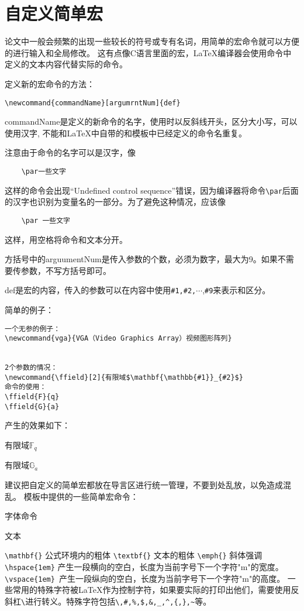 \documentclass[supercite,fontset=windows]{../../upcthesis}
\begin{document}
\section{自定义简单宏}
论文中一般会频繁的出现一些较长的符号或专有名词，用简单的宏命令就可以方便的进行输入和全局修改。
这有点像C语言里面的宏，LaTeX编译器会使用命令中定义的文本内容代替实际的命令。

定义新的宏命令的方法：

\begin{verbatim}
\newcommand{commandName}[argumrntNum]{def}
\end{verbatim}

commandName是定义的新命令的名字，使用时以反斜线开头，区分大小写，可以使用汉字,
不能和LaTeX中自带的和模板中已经定义的命令名重复。

注意由于命令的名字可以是汉字，像
\begin{verbatim}
	\par一些文字
\end{verbatim}
这样的命令会出现“Undefined control sequence”错误，因为编译器将命令\verb|\par|后面的汉字也识别为变量名的一部分。为了避免这种情况，应该像
\begin{verbatim}
	\par 一些文字
\end{verbatim}
这样，用空格将命令和文本分开。

方括号中的arguumentNum是传入参数的个数，必须为数字，最大为9。如果不需要传参数，不写方括号即可。

def是宏的内容，传入的参数可以在内容中使用\verb|#1,#2,|$\cdots$,\verb|#9|来表示和区分。

简单的例子：

\begin{verbatim}
一个无参的例子：
\newcommand{vga}{VGA（Video Graphics Array）视频图形阵列}


2个参数的情况：
\newcommand{\ffield}[2]{有限域$\mathbf{\mathbb{#1}}_{#2}$}
命令的使用：
\ffield{F}{q}
\ffield{G}{a}

\end{verbatim}

产生的效果如下：
\newcommand{\ffield}[2]{有限域$\mathbf{\mathbb{#1}}_{#2}$}

\ffield{F}{q}

\ffield{G}{a}




建议把自定义的简单宏都放在导言区进行统一管理，不要到处乱放，以免造成混乱。
模板中提供的一些简单宏命令：

字体命令

文本


\verb|\mathbf{}| 公式环境内的粗体
\verb|\textbf{}| 文本的粗体
\verb|\emph{}| 斜体强调
\verb|\hspace{1em}| 产生一段横向的空白，长度为当前字号下一个字符"m"的宽度。
\verb|\vspace{1em} |产生一段纵向的空白，长度为当前字号下一个字符"m"的高度。
一些常用的特殊字符被LaTeX作为控制字符，如果要实际的打印出他们，需要使用反斜杠\verb|\|进行转义。特殊字符包括\verb|\,#,%,$,&,_,^,{,},~|等。
\end{document}
